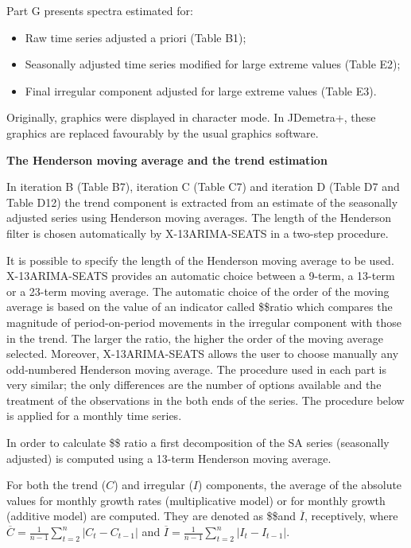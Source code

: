 \documentclass[
  letterpaper,
  DIV=11,
  numbers=noendperiod]{scrreprt}
\begin{document}
Part G presents spectra estimated for:

\begin{itemize}
\item
  Raw time series adjusted a priori (Table B1);
\item
  Seasonally adjusted time series modified for large extreme values
  (Table E2);
\item
  Final irregular component adjusted for large extreme values (Table
  E3).
\end{itemize}

Originally, graphics were displayed in character mode. In JDemetra+,
these graphics are replaced favourably by the usual graphics software.

\textbf{The Henderson moving average and the trend estimation}

In iteration B (Table B7), iteration C (Table C7) and iteration D (Table
D7 and Table D12) the trend component is extracted from an estimate of
the seasonally adjusted series using Henderson moving averages. The
length of the Henderson filter is chosen automatically by
X-13ARIMA-SEATS in a two-step procedure.

It is possible to specify the length of the Henderson moving average to
be used. X-13ARIMA-SEATS provides an automatic choice between a 9-term,
a 13-term or a 23-term moving average. The automatic choice of the order
of the moving average is based on the value of an indicator called
\$\$ratio which compares the magnitude
of period-on-period movements in the irregular component with those in
the trend. The larger the ratio, the higher the order of the moving
average selected. Moreover, X-13ARIMA-SEATS allows the user to choose
manually any odd‑numbered Henderson moving average. The procedure used
in each part is very similar; the only differences are the number of
options available and the treatment of the observations in the both ends
of the series. The procedure below is applied for a monthly time series.

In order to calculate \$\$ ratio a
first decomposition of the SA series (seasonally adjusted) is computed
using a 13-term Henderson moving average.

For both the trend (\(C\)) and irregular (\(I\)) components, the average
of the absolute values for monthly growth rates (multiplicative model)
or for monthly growth (additive model) are computed. They are denoted as
\$\$and \(\overline{I}\), receptively, where
\(\overline{C} = \frac{1}{n - 1}\sum_{t = 2}^{n}\left| C_{t} - C_{t - 1} \right|\)
and
\(\overline{I} = \frac{1}{n - 1}\sum_{t = 2}^{n}\left| I_{t} - I_{t - 1} \right|\).
\end{document}
